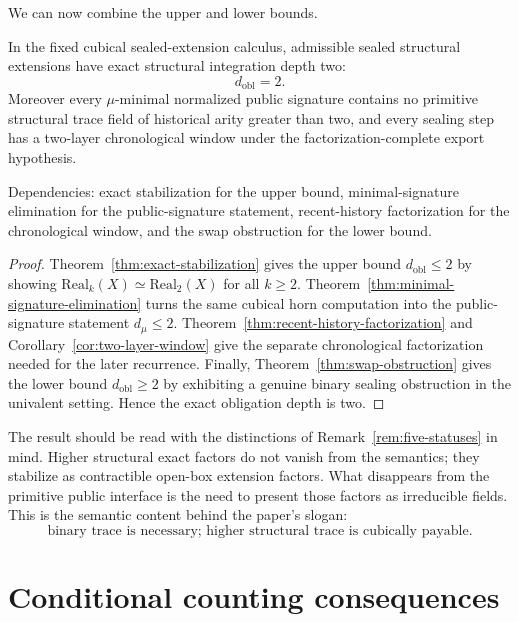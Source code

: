 \documentclass{lmcs}
\begin{document}
We can now combine the upper and lower bounds.

\begin{cor}
\label{cor:exact-depth-two}
In the fixed cubical sealed-extension calculus, admissible sealed structural extensions have
exact structural integration depth two:
\[
  d_{\mathrm{obl}}=2.
\]
Moreover every \(\mu\)-minimal normalized public signature contains no primitive structural
trace field of historical arity greater than two, and every sealing step has a two-layer
chronological window under the factorization-complete export hypothesis.

Dependencies: exact stabilization for the upper bound, minimal-signature elimination for
the public-signature statement, recent-history factorization for the chronological window,
and the swap obstruction for the lower bound.
\end{cor}

\begin{proof}
Theorem~\ref{thm:exact-stabilization} gives the upper bound
\(d_{\mathrm{obl}}\leq 2\) by showing
\(\mathrm{Real}_k(X)\simeq\mathrm{Real}_2(X)\) for all \(k\geq 2\).  Theorem~\ref{thm:minimal-signature-elimination}
turns the same cubical horn computation into the public-signature statement
\(d_\mu\leq 2\).  Theorem~\ref{thm:recent-history-factorization} and
Corollary~\ref{cor:two-layer-window} give the separate chronological factorization needed
for the later recurrence.  Finally, Theorem~\ref{thm:swap-obstruction} gives the lower bound
\(d_{\mathrm{obl}}\geq 2\) by exhibiting a genuine binary sealing obstruction in the univalent
setting.  Hence the exact obligation depth is two.
\end{proof}

The result should be read with the distinctions of Remark~\ref{rem:five-statuses} in mind.
Higher structural exact factors do not vanish from the semantics; they stabilize as
contractible open-box extension factors.  What disappears from the primitive public
interface is the need to present those factors as irreducible fields.  This is the semantic
content behind the paper's slogan:
\[
  \text{binary trace is necessary; higher structural trace is cubically payable.}
\]

\section{Conditional counting consequences}
\label{sec:scaling}
\end{document}
